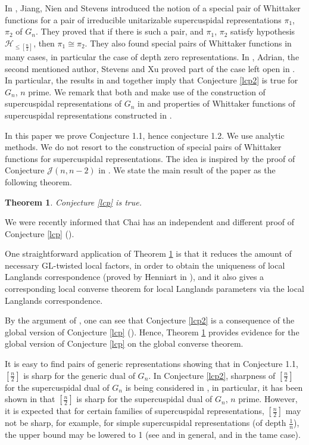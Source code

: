 \documentclass[12pt]{amsart}
\newtheorem{thm}{Theorem}[section]
\begin{document}
In \cite{JNS15}, Jiang, Nien and Stevens introduced
the notion of a special pair of Whittaker functions for a pair of irreducible unitarizable supercuspidal representations $\pi_1$, $\pi_2$ of $G_n$. They proved that if there is such a pair, and $\pi_1$, $\pi_2$ satisfy hypothesis ${{\mathcal {H}}}_{\leq [\frac{n}{2}]}$, then $\pi_1 \cong \pi_2$. They also found special pairs of Whittaker functions in many cases, in particular the case of depth zero representations. In \cite{ALSX15}, Adrian, the second mentioned author, Stevens and Xu proved part of the case left open in \cite{JNS15}.
In particular, the results in \cite{JNS15} and \cite{ALSX15} together imply that Conjecture \ref{lcp2} is true for $G_n$, $n$ prime. 
We remark that both \cite{JNS15} and \cite{ALSX15} make use of the construction of supercuspidal representations of $G_n$ in \cite{BK93} and properties of Whittaker functions of supercuspidal representations constructed in \cite{PS08}.  

In this paper we prove Conjecture 1.1, hence conjecture 1.2. We use analytic methods. We do not resort to the construction of special pairs of Whittaker functions for supercuspidal representations.
The idea is inspired by the proof of Conjecture ${{\mathcal {J}}}(n,n-2)$ in \cite{Ch06}. We state the main result of the paper as the following theorem. 

\begin{thm}\label{main}
Conjecture \ref{lcp} is true. 
\end{thm}

We were recently informed that Chai has an independent and different proof of Conjecture \ref{lcp} (\cite{Ch15}). 

One straightforward application of Theorem \ref{main} is that it reduces the amount of necessary ${{\mathrm{GL}}}$-twisted local factors, in order to obtain the uniqueness of local Langlands correspondence (proved by Henniart in \cite{H02}), and it also gives a corresponding local converse theorem for local Langlands parameters via the local Langlands correspondence. 

By the argument of \cite[Section 7, Theorem]{CPS99}, one can see that Conjecture \ref{lcp2} is a consequence of the global version of Conjecture \ref{lcp} (\cite[Section 8, Conjecture 1]{CPS99}). Hence, Theorem \ref{main} provides evidence for the global version of Conjecture \ref{lcp} on the global converse theorem. 

It is easy to find pairs of generic representations showing that in Conjecture 1.1, $[\frac{n}{2}]$ is sharp for the generic dual of $G_n$. In Conjecture \ref{lcp2}, sharpness of $[\frac{n}{2}]$ for the supercuspidal dual of $G_n$ is being considered in \cite{ALST15}, in particular, it has been shown in \cite{ALST15} that $[\frac{n}{2}]$ is sharp for the supercuspidal dual of $G_n$, $n$ prime. However, it is expected that for certain families of supercuspidal representations, $[\frac{n}{2}]$ may not be sharp, for example, for simple supercuspidal representations (of depth $\frac{1}{n}$), the upper bound may be lowered to 1 (see \cite[Proposition 2.2]{BH14} and \cite[Remark 3.18]{AL15} in general, and \cite{X13} in the tame case).
\end{document}
